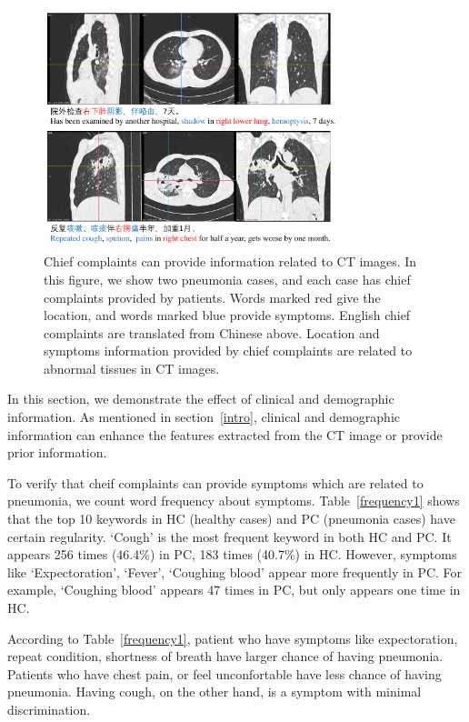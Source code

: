 \documentclass[journal]{IEEEtran}
\begin{document}
\begin{figure}[t]
    \centerline{\includegraphics[width=85mm]{txtpic.pdf}}
    \vspace{-0cm}
    \caption{Chief complaints can provide information related to CT images. In this figure, we show two pneumonia cases, and each case has chief complaints provided by patients. Words marked red give the location, and words marked blue provide symptoms. English chief complaints are translated from Chinese above. Location and symptoms information provided by chief complaints are related to abnormal tissues in CT images.}
    \vspace{-0cm}
    \label{txtpic}
    \end{figure}

In this section, we demonstrate the effect of clinical and demographic information.
As mentioned in section~\ref{intro}, clinical and demographic information can enhance the features extracted from the CT image or provide prior information. 

To verify that cheif complaints can provide symptoms which are related to pneumonia, we count word frequency about symptoms. Table~\ref{frequency1} shows that the top 10 keywords in HC (healthy cases) and PC (pneumonia cases) have certain regularity. `Cough' is the most frequent keyword in both HC and PC. It appears 256 times (46.4\%) in PC, 183 times (40.7\%) in HC. However, symptoms like `Expectoration', `Fever', `Coughing blood' appear more frequently in PC. For example, `Coughing blood' appears 47 times in PC, but only appears one time in HC. 

According to Table~\ref{frequency1}, patient who have symptoms like expectoration, repeat condition, shortness of breath have larger chance of having pneumonia. Patients who have chest pain, or feel unconfortable have less chance of having pneumonia. Having cough, on the other hand, is a symptom with minimal discrimination.
\end{document}
